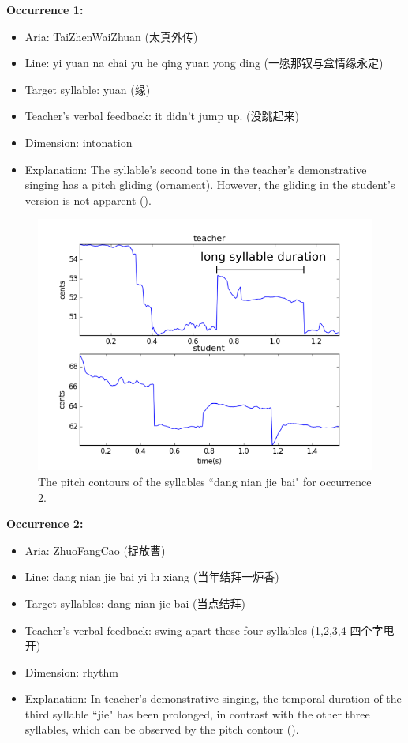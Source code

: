 \noindent\textbf{Occurrence 1:}

\begin{itemize}[leftmargin=*, noitemsep]
\item Aria: TaiZhenWaiZhuan (太真外传)
\item Line: yi yuan na chai yu he qing yuan yong ding (一愿那钗与盒情缘永定)
\item Target syllable: yuan (缘)
\item Teacher's verbal feedback: it didn't jump up. (没跳起来) 
\item Dimension: intonation
\item Explanation: The syllable's second tone in the teacher's demonstrative singing has a pitch gliding (ornament). However, the gliding in the student's version is not apparent ().
\end{itemize}

\begin{figure}[ht!]
\includegraphics[width=\textwidth]{figs/spectro_vis/ch3_occ2.png}
\caption{The pitch contours of the syllables ``dang nian jie bai" for occurrence 2.}
\label{fig:occurrence_2}
\end{figure}

\noindent\textbf{Occurrence 2:}

\begin{itemize}[leftmargin=*, noitemsep]
\item Aria: ZhuoFangCao (捉放曹)
\item Line: dang nian jie bai yi lu xiang (当年结拜一炉香)
\item Target syllables: dang nian jie bai (当点结拜)
\item Teacher's verbal feedback: swing apart these four syllables (1,2,3,4 四个字甩开)
\item Dimension: rhythm
\item Explanation: In teacher's demonstrative singing, the temporal duration of the third syllable ``jie" has been prolonged, in contrast with the other three syllables, which can be observed by the pitch contour ().
\end{itemize}

